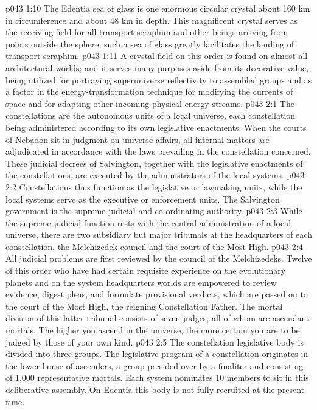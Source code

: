 \vs p043 1:10 The Edentia sea of glass is one enormous circular crystal about 160 km in circumference and about 48 km in depth. This magnificent crystal serves as the receiving field for all transport seraphim and other beings arriving from points outside the sphere; such a sea of glass greatly facilitates the landing of transport seraphim.
\vs p043 1:11 A crystal field on this order is found on almost all architectural worlds; and it serves many purposes aside from its decorative value, being utilized for portraying superuniverse reflectivity to assembled groups and as a factor in the energy\hyp{}transformation technique for modifying the currents of space and for adapting other incoming physical\hyp{}energy streams.
\vs p043 2:1 The constellations are the autonomous units of a local universe, each constellation being administered according to its own legislative enactments. When the courts of Nebadon sit in judgment on universe affairs, all internal matters are adjudicated in accordance with the laws prevailing in the constellation concerned. These judicial decrees of Salvington, together with the legislative enactments of the constellations, are executed by the administrators of the local systems.
\vs p043 2:2 Constellations thus function as the legislative or lawmaking units, while the local systems serve as the executive or enforcement units. The Salvington government is the supreme judicial and co\hyp{}ordinating authority.
\vs p043 2:3 \pc While the supreme judicial function rests with the central administration of a local universe, there are two subsidiary but major tribunals at the headquarters of each constellation, the Melchizedek council and the court of the Most High.
\vs p043 2:4 All judicial problems are first reviewed by the council of the Melchizedeks. Twelve of this order who have had certain requisite experience on the evolutionary planets and on the system headquarters worlds are empowered to review evidence, digest pleas, and formulate provisional verdicts, which are passed on to the court of the Most High, the reigning Constellation Father. The mortal division of this latter tribunal consists of seven judges, all of whom are ascendant mortals. The higher you ascend in the universe, the more certain you are to be judged by those of your own kind.
\vs p043 2:5 \pc The constellation legislative body is divided into three groups. The legislative program of a constellation originates in the lower house of ascenders, a group presided over by a finaliter and consisting of 1,000 representative mortals. Each system nominates 10 members to sit in this deliberative assembly. On Edentia this body is not fully recruited at the present time.
